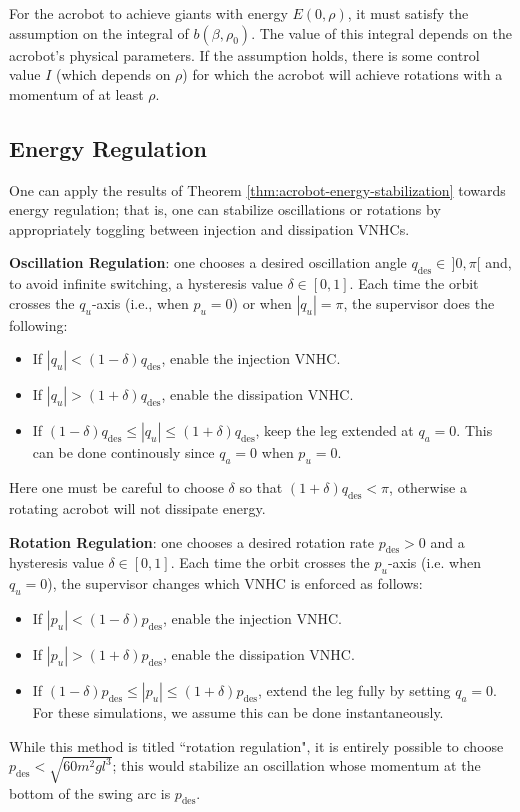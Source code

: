 \documentclass[journal,twoside,web, onecolumn, draftcls]{ieeecolor}
\begin{document}
For the acrobot to achieve giants with energy
\(E(0,\rho)\), it must satisfy the assumption on the integral
of \(b(\beta,\rho_0)\). 
The value of this integral depends on the acrobot's physical parameters.
If the assumption holds, there is some control value \(I\)
(which depends on \(\rho\)) for which the acrobot will 
achieve rotations with a momentum of at least \(\rho\).

\subsection{Energy Regulation}\label{sec:energy-reg}
One can apply the results of Theorem \ref{thm:acrobot-energy-stabilization} 
towards energy regulation;
that is, one can stabilize oscillations or rotations by appropriately toggling
between injection and dissipation VNHCs.

\textbf{Oscillation Regulation}: one chooses a desired oscillation angle 
\(q_\text{des} \in \, ]0,\pi[\) and, to avoid infinite switching, a
hysteresis value \(\delta \in [0,1]\).
Each time the orbit crosses the \(q_u\)-axis (i.e., when \(p_u = 0\)) or 
when \(|q_u| = \pi\), the supervisor does the following: 
\begin{itemize}
    \item If \(|q_u| < (1-\delta)q_\text{des}\), enable the injection VNHC.
    \item If \(|q_u| > (1+\delta)q_\text{des}\), enable the dissipation VNHC.
    \item If \((1-\delta)q_\text{des} \leq |q_u| \leq (1+\delta)q_\text{des}\),
        keep the leg extended at \(q_a = 0\). This can be done continously since
        \(q_a = 0\) when \(p_u = 0\).
\end{itemize}
Here one must be careful to choose \(\delta\) so that
\((1+\delta)q_\text{des} < \pi\), otherwise a rotating acrobot will not
dissipate energy.

\textbf{Rotation Regulation}: one chooses a desired rotation rate 
\(p_\text{des} > 0\) and a hysteresis value \(\delta \in [0,1]\).
Each time the orbit crosses the \(p_u\)-axis (i.e. when \(q_u = 0\)), the
supervisor changes which VNHC is enforced as follows:
\begin{itemize}
    \item If \(|p_u| < (1-\delta)p_\text{des}\), enable the injection VNHC.
    \item If \(|p_u| > (1+\delta)p_\text{des}\), enable the dissipation VNHC.
    \item If \((1-\delta)p_\text{des} \leq |p_u| \leq (1+\delta)p_\text{des}\),
        extend the leg fully by setting \(q_a = 0\).
        For these simulations, we assume this can be done instantaneously.
\end{itemize}
While this method is titled ``rotation regulation", it is entirely possible to
choose \(p_\text{des} < \sqrt{60m^2gl^3}\);
this would stabilize an oscillation whose momentum at the bottom of the swing
arc is \(p_\text{des}\).
\end{document}
